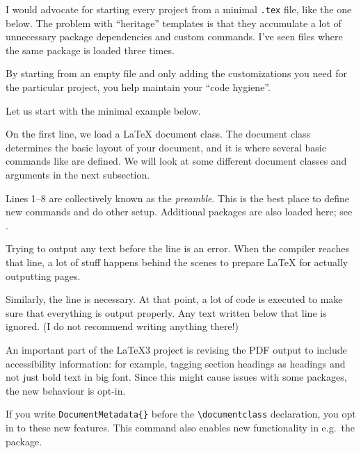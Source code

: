 \begin{practices}
I would advocate for starting every project from a minimal \verb|.tex| file, like the one below.
The problem with ``heritage'' templates is that they accumulate a lot
of unnecessary package dependencies and custom commands.
I've seen files where the same package is loaded three times.

By starting from an empty file
and only adding the customizations you need for the particular project,
you help maintain your ``code hygiene''.
\end{practices}

Let us start with the minimal example below.


On the first line, we load a \LaTeX{} document class.
The document class determines the basic layout of your document,
and it is where several basic commands like  are defined.
We will look at some different document classes and arguments in the next subsection.

Lines 1--8 are collectively known as the \emph{preamble}.
This is the best place to define new commands and do other setup.
Additional packages are also loaded here; see .

Trying to output any text before the \verb|| line is an error.
%
When the compiler reaches that line,
a lot of stuff happens behind the scenes to prepare \LaTeX{} for actually outputting pages.

Similarly, the \verb|| line is necessary.
At that point, a lot of code is executed to make sure that everything is output properly.
Any text written below that line is ignored.
(I do not recommend writing anything there!)

\begin{latexthree}
An important part of the \LaTeX3 project is revising the PDF output
to include accessibility information:
for example, tagging section headings as headings and not just bold text in big font.
Since this might cause issues with some packages, the new behaviour is opt-in.

If you write \verb|DocumentMetadata{}|
before the \verb|\documentclass| declaration, you opt in to these new features.
This command also enables new functionality in e.g.\ the  package.
\end{latexthree}


